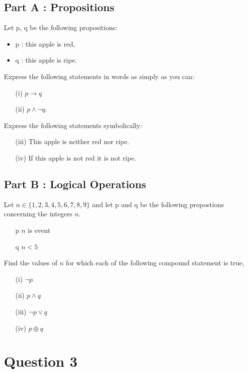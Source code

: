 \documentclass[]{report}
\begin{document}
	\subsection*{Part A : Propositions}
	Let p, q be the following propositions:
	\begin{itemize}
		\item p : this apple is red, 
		\item q : this apple is ripe.
	\end{itemize}
	
	\noindent Express the following statements in words as simply as you can:
	\begin{itemize}
		\item[(i)] $p \rightarrow q$
		\item[(ii)] $p \wedge \neg q$.
	\end{itemize}
	
	\noindent Express the following statements symbolically:
	\begin{itemize}
		\item[(iii)] This apple is neither red nor ripe.
		\item[(iv)] If this apple is not red it is not ripe.
	\end{itemize}
	
	\subsection*{Part B : Logical Operations}
	Let $n \in \{1,2,3,4,5,6,7,8,9\}$ and let p and q be the following propostions concerning 
	the integers $n$.
	
	\begin{itemize}
		\item[p] $n$ is event
		\item[q] $n<5$
	\end{itemize}
	
	Find the values of $n$ for which each of the following compound statement is true,
	
	\begin{itemize}
		\item[(i)] $\neg p$
		\item[(ii)] $p \wedge q$
		\item[(iii)] $\neg p \vee q$ 
		\item[(iv)] $p \oplus q$
	\end{itemize}
	
\section*{Question 3}
\end{document}
